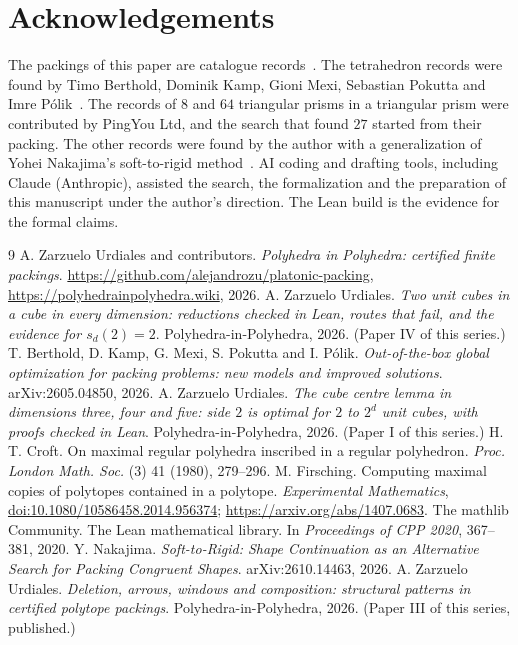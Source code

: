 \documentclass[11pt,a4paper]{article}
\begin{document}
\section*{Acknowledgements}
The packings of this paper are catalogue records~\cite{archive}. The tetrahedron records were found by Timo Berthold, Dominik Kamp, Gioni Mexi, Sebastian Pokutta and Imre P\'olik~\cite{bkmpp}. The records of $8$ and $64$ triangular prisms in a triangular prism were contributed by PingYou Ltd, and the search that found $27$ started from their packing. The other records were found by the author with a generalization of Yohei Nakajima's soft-to-rigid method~\cite{nakajima}. AI coding and drafting tools, including Claude (Anthropic), assisted the search, the formalization and the preparation of this manuscript under the author's direction. The Lean build is the evidence for the formal claims.

\begin{thebibliography}{9}
 A. Zarzuelo Urdiales and contributors. \emph{Polyhedra in Polyhedra: certified finite packings}. \url{https://github.com/alejandrozu/platonic-packing}, \url{https://polyhedrainpolyhedra.wiki}, 2026.
 A. Zarzuelo Urdiales. \emph{Two unit cubes in a cube in every dimension: reductions checked in Lean, routes that fail, and the evidence for $s_d(2)=2$}. Polyhedra-in-Polyhedra, 2026. (Paper IV of this series.)
 T. Berthold, D. Kamp, G. Mexi, S. Pokutta and I. P\'olik. \emph{Out-of-the-box global optimization for packing problems: new models and improved solutions}. arXiv:2605.04850, 2026.
 A. Zarzuelo Urdiales. \emph{The cube centre lemma in dimensions three, four and five: side $2$ is optimal for $2$ to $2^d$ unit cubes, with proofs checked in Lean}. Polyhedra-in-Polyhedra, 2026. (Paper I of this series.)
 H. T. Croft. On maximal regular polyhedra inscribed in a regular polyhedron. \emph{Proc. London Math. Soc.} (3) 41 (1980), 279--296.
 M. Firsching. Computing maximal copies of polytopes contained in a polytope. \emph{Experimental Mathematics}, \href{https://doi.org/10.1080/10586458.2014.956374}{doi:10.1080/10586458.2014.956374}; \url{https://arxiv.org/abs/1407.0683}.
 The mathlib Community. The Lean mathematical library. In \emph{Proceedings of CPP 2020}, 367--381, 2020.
 Y. Nakajima. \emph{Soft-to-Rigid: Shape Continuation as an Alternative Search for Packing Congruent Shapes}. arXiv:2610.14463, 2026.
 A. Zarzuelo Urdiales. \emph{Deletion, arrows, windows and composition: structural patterns in certified polytope packings}. Polyhedra-in-Polyhedra, 2026. (Paper III of this series, published.)
\end{thebibliography}
\end{document}
